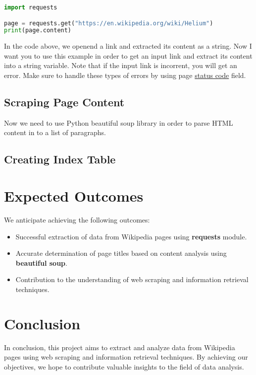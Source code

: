 \documentclass{article}
\begin{document}
\begin{lstlisting}[language=Python, caption=Example of getting a page content]
import requests

page = requests.get("https://en.wikipedia.org/wiki/Helium")
print(page.content)
\end{lstlisting}

In the code above, we openend a link and extracted its content as a string. Now I want you to use this example
in order to get an input link and extract its content into a string variable. Note that if the input link is incorrent, you will get
an error. Make sure to handle these types of errors by using page \underline{status code} field.

\subsection{Scraping Page Content}
Now we need to use Python beautiful soup library in order to parse HTML content in to a list of paragraphs.

\subsection{Creating Index Table}

\section{Expected Outcomes}
We anticipate achieving the following outcomes:
\begin{itemize}
    \item Successful extraction of data from Wikipedia pages using \textbf{requests} module.
    \item Accurate determination of page titles based on content analysis using \textbf{beautiful soup}.
    \item Contribution to the understanding of web scraping and information retrieval techniques.
\end{itemize}

\section{Conclusion}
In conclusion, this project aims to extract and analyze data from Wikipedia pages using web scraping and information retrieval techniques. By achieving our objectives, we hope to contribute valuable insights to the field of data analysis.

% 
% 
\end{document}
